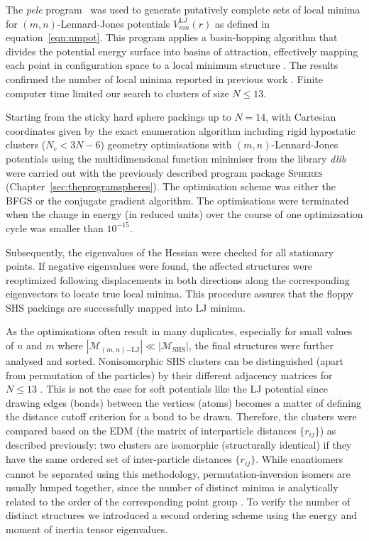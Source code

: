 The \textit{pele} program~\autocite{_pelePythonenergy_2017} was used to generate putatively
complete sets of local minima for $(m,n)$-Lennard-Jones potentials 
$V_{mn}^{\mathrm LJ}(r)$ as defined in equation~\eqref{eqn:nmpot}.
This program  applies a basin-hopping algorithm that divides the potential energy
surface into basins of attraction, effectively mapping each point in
configuration space to a local minimum structure
\autocite{Li_MonteCarlominimizationapproach_1987,waless99,Wales_GlobalOptimizationBasinHopping_1997}.  The results confirmed the
number of local minima reported in previous work \autocite{Doye_Saddlepointsdynamics_2002}.
Finite computer time limited our search to clusters of size $N \leq 13$.

Starting from the sticky hard sphere packings up to $N=14$, with Cartesian
coordinates given by the exact enumeration algorithm
\autocite{Hoy_Structurefinitesphere_2012} including rigid hypostatic clusters
($N_c<3N-6$) \autocite{Holmes-Cerfon_EnumeratingRigidSphere_2016} geometry
optimisations with $(m,n)$-Lennard-Jones potentials using the multidimensional
function minimiser from the \Cpp library \textit{dlib}
\autocite{King_DlibmlMachineLearning_2009} were carried out with the previously
described program package \textsc{Spheres}
(Chapter~\ref{sec:theprogramspheres}). The optimisation scheme was either the
\ac{BFGS} or the conjugate gradient algorithm. The optimisations were terminated when the
change in energy (in reduced units) over the course of one optimizsation cycle
was smaller than $10^{-15}$. 

Subsequently, the eigenvalues of the Hessian were checked
for all stationary points. If negative eigenvalues were found, the affected
structures were reoptimized following displacements in both directions along
the corresponding eigenvectors to locate true local minima. This procedure assures
that the floppy \ac{SHS} packings are successfully mapped into LJ minima.

As the optimisations often result in many duplicates, especially for small
values of $n$ and $m$ where $|\mathcal{M}_{(m,n)\mathrm{-LJ}}| \ll
|\mathcal{M}_\mathrm{SHS}|$, the final structures were further analysed and
sorted. Nonisomorphic \ac{SHS} clusters can be distinguished (apart from
permutation of the particles) by their different adjacency matrices for $N \leq
13$ \autocite{Holmes-Cerfon_EnumeratingRigidSphere_2016}.  This is not the case
for soft potentials like the LJ potential since drawing edges (bonds) between
the vertices (atoms) becomes a matter of defining the distance cutoff criterion
for a bond to be drawn. Therefore, the clusters were compared based on the
\ac{EDM} (the matrix of interparticle distances $\{r_{ij}\}$) as described
previously: two clusters are isomorphic (structurally identical) if they have
the same ordered set of inter-particle distances $\{r_{ij}\}$.  While
enantiomers cannot be separated using this methodology, permutation-inversion
isomers are usually lumped together, since the number of distinct minima is
analytically related to the order of the corresponding point group
\autocite{Wales_Energylandscapes_2003}.  To verify the number of distinct structures we introduced
a second ordering scheme using the energy and moment of inertia tensor
eigenvalues. 

